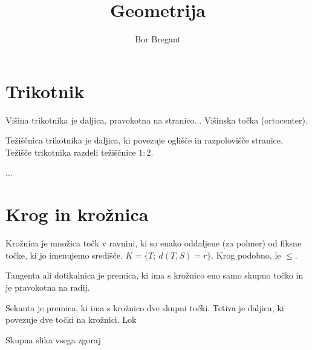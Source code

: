 \documentclass{article}
\title{Geometrija}
\author{Bor Bregant}
\date{\vspace{-5ex}}
\begin{document}
\maketitle

\section{Trikotnik}

Višina trikotnika je daljica, pravokotna na stranico... Višinska točka (ortocenter).

Težiščnica trikotnika je daljica, ki povezuje oglišče in razpolovišče stranice. Težišče trikotnika razdeli težiščnice $1:2$.

...

\section{Krog in krožnica}

Krožnica je množica točk v ravnini, ki so enako oddaljene (za polmer) od fiksne točke, ki jo imenujemo središče.  $K = \{T;\ d(T,S)=r\}$. Krog podobno, le $\leq$.

Tangenta ali dotikalnica je premica, ki ima s krožnico eno samo skupno točko in je pravokotna na radij.

Sekanta je premica, ki ima s krožnico dve skupni točki. Tetiva je daljica, ki povezuje dve točki na krožnici. Lok

Skupna slika vsega zgoraj
\end{document}
